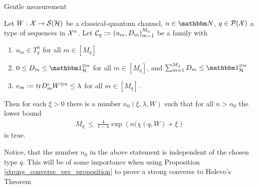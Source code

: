 \begin{subsubsection}{Gentle measurement}
	\begin{proposition}\label{strong_converse_pre_proposition}
	 Let $W: {\mathcal X} \rightarrow {\mathcal S}({\mathcal H})$ be a classical-quantum channel, $n \in \bbmN$, $q \in {\mathcal P}({\mathcal X})$ a type of sequences in ${\mathcal X}^n$. Let ${\mathcal C}_q := (u_m,D_m)_{m=1}^{M_q}$ be a family with 
	 \begin{enumerate}
	  \item $u_m \in T_q^n$ for all $m \in [M_q]$
	  \item $0 \leq D_m \leq \bbmeins_\cH^{\otimes n}$ for all $m \in [M_q]$, and $\sum_{m=1}^{M_q} D_m \leq \bbmeins_{\cH}^{\otimes n}$
	  \item $e_m := \mathrm{tr} D_m^c W^{\otimes n} \leq \lambda$ for all $m \in [M_q]$.
	 \end{enumerate}
	 Then for each $\xi > 0$ there is a number $n_0(\xi,\lambda,W)$ such that for all $n > n_0$ the lower bound
	 \begin{align}
	  M_q \ \leq \ \frac{4}{1 - \lambda}  \exp\left(n(\chi(q,W) + \xi  \right)
	 \end{align}
        is true. 
	\end{proposition}
	\begin{remark}
	 Notice, that the number $n_0$ in the above statement is independent of the chosen type $q$. This will be of some importance when using Proposition \ref{strong_converse_pre_proposition} to prove a strong converse to Holevo's Theorem 
	\end{remark}


\end{subsubsection}
